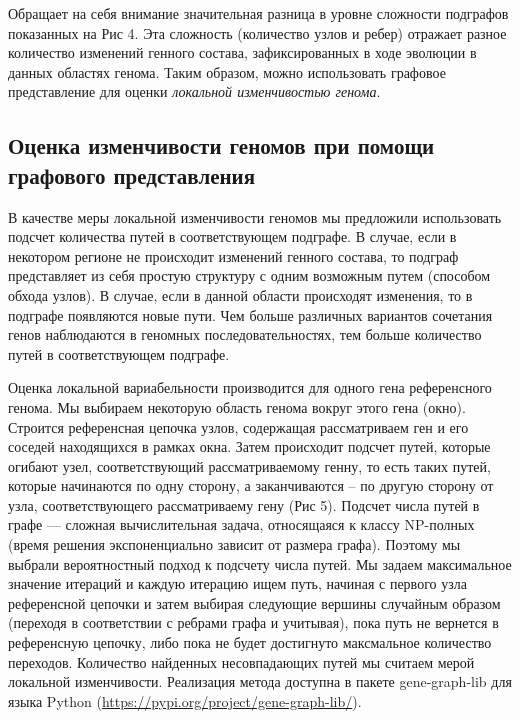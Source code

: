 Обращает на себя внимание значительная разница в уровне сложности подграфов показанных на Рис 4. Эта сложность (количество узлов и ребер) отражает разное количество изменений генного состава, зафиксированных в ходе эволюции в данных областях генома. Таким образом, можно использовать графовое представление для оценки \textit{локальной изменчивостью генома}. 

\subsection*{Оценка изменчивости геномов при помощи графового представления}
В качестве меры локальной изменчивости геномов мы предложили использовать подсчет количества путей в соответствующем подграфе. В случае, если в некотором регионе не происходит изменений генного состава, то подграф представляет из себя простую структуру с одним возможным путем (способом обхода узлов). В случае, если в данной области происходят изменения, то в подграфе появляются новые пути. Чем больше различных вариантов сочетания генов наблюдаются в геномных последовательностях, тем больше количество путей в соответствующем подграфе. 

Оценка локальной вариабельности производится для одного гена референсного генома. Мы выбираем некоторую область генома вокруг этого гена (окно).  Строится референсная цепочка узлов, содержащая рассматриваем ген и его соседей находящихся в рамках окна. Затем происходит подсчет путей, которые огибают узел, соответствующий рассматриваемому генну, то есть таких путей, которые начинаются по одну сторону, а заканчиваются -- по другую сторону от узла, соответствующего рассматриваему гену (Рис 5). Подсчет числа путей в графе --- сложная вычислительная задача, относящаяся к классу NP-полных (время решения экспоненциально зависит от размера графа). Поэтому мы выбрали вероятностный подход к подсчету числа путей. Мы задаем максимальное значение итераций и каждую итерацию ищем путь, начиная с первого узла референсной цепочки и затем выбирая следующие вершины случайным образом (переходя в соответствии с ребрами графа и учитывая), пока путь не вернется в референсную цепочку, либо пока не будет достигнуто максмальное количество переходов. Количество найденных несовпадающих путей мы считаем мерой локальной изменчивости. Реализация метода доступна в пакете gene-graph-lib для языка Python (\url{https://pypi.org/project/gene-graph-lib/}).

